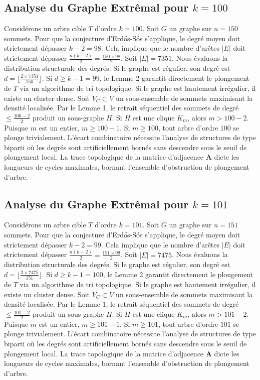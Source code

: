 \documentclass[11pt,a4paper]{article}
\begin{document}
\subsection{Analyse du Graphe Extr\^emal pour $k=100$}
Consid\'erons un arbre cible $T$ d'ordre $k=100$.
Soit $G$ un graphe sur $n=150$ sommets.
Pour que la conjecture d'Erd\H{o}s-S\'os s'applique, le degr\'e moyen doit strictement d\'epasser $k-2 = 98$.
Cela implique que le nombre d'ar\^etes $|E|$ doit strictement d\'epasser $\frac{n(k-2)}{2} = \frac{150 \times 98}{2}$.
Soit $|E| = 7351$.
Nous \'evaluons la distribution structurale des degr\'es. Si le graphe est r\'egulier, son degr\'e est $d = \lfloor \frac{2 \times 7351}{150} \rfloor$.
Si $d \geq k-1 = 99$, le Lemme 2 garantit directement le plongement de $T$ via un algorithme de tri topologique.
Si le graphe est hautement irr\'egulier, il existe un cluster dense. Soit $V_C \subset V$ un sous-ensemble de sommets maximisant la densit\'e localis\'ee.
Par le Lemme 1, le retrait s\'equentiel des sommets de degr\'e $\leq \frac{100-2}{2}$ produit un sous-graphe $H$.
Si $H$ est une clique $K_{m}$, alors $m > 100-2$. Puisque $m$ est un entier, $m \geq 100-1$. Si $m \geq 100$, tout arbre d'ordre $100$ se plonge trivialement.
L'\'ecart combinatoire n\'ecessite l'analyse de structures de type biparti o\`u les degr\'es sont artificiellement born\'es sans descendre sous le seuil de plongement local. La trace topologique de la matrice d'adjacence $\mathbf{A}$ dicte les longueurs de cycles maximales, bornant l'ensemble d'obstruction de plongement d'arbre.


\subsection{Analyse du Graphe Extr\^emal pour $k=101$}
Consid\'erons un arbre cible $T$ d'ordre $k=101$.
Soit $G$ un graphe sur $n=151$ sommets.
Pour que la conjecture d'Erd\H{o}s-S\'os s'applique, le degr\'e moyen doit strictement d\'epasser $k-2 = 99$.
Cela implique que le nombre d'ar\^etes $|E|$ doit strictement d\'epasser $\frac{n(k-2)}{2} = \frac{151 \times 99}{2}$.
Soit $|E| = 7475$.
Nous \'evaluons la distribution structurale des degr\'es. Si le graphe est r\'egulier, son degr\'e est $d = \lfloor \frac{2 \times 7475}{151} \rfloor$.
Si $d \geq k-1 = 100$, le Lemme 2 garantit directement le plongement de $T$ via un algorithme de tri topologique.
Si le graphe est hautement irr\'egulier, il existe un cluster dense. Soit $V_C \subset V$ un sous-ensemble de sommets maximisant la densit\'e localis\'ee.
Par le Lemme 1, le retrait s\'equentiel des sommets de degr\'e $\leq \frac{101-2}{2}$ produit un sous-graphe $H$.
Si $H$ est une clique $K_{m}$, alors $m > 101-2$. Puisque $m$ est un entier, $m \geq 101-1$. Si $m \geq 101$, tout arbre d'ordre $101$ se plonge trivialement.
L'\'ecart combinatoire n\'ecessite l'analyse de structures de type biparti o\`u les degr\'es sont artificiellement born\'es sans descendre sous le seuil de plongement local. La trace topologique de la matrice d'adjacence $\mathbf{A}$ dicte les longueurs de cycles maximales, bornant l'ensemble d'obstruction de plongement d'arbre.
\end{document}
